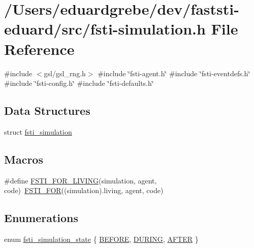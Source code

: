 \hypertarget{fsti-simulation_8h}{}\section{/\+Users/eduardgrebe/dev/faststi-\/eduard/src/fsti-\/simulation.h File Reference}
\label{fsti-simulation_8h}
{\ttfamily \#include $<$gsl/gsl\+\_\+rng.\+h$>$}\newline
{\ttfamily \#include \char`\"{}fsti-\/agent.\+h\char`\"{}}\newline
{\ttfamily \#include \char`\"{}fsti-\/eventdefs.\+h\char`\"{}}\newline
{\ttfamily \#include \char`\"{}fsti-\/config.\+h\char`\"{}}\newline
{\ttfamily \#include \char`\"{}fsti-\/defaults.\+h\char`\"{}}\newline
\subsection*{Data Structures}
\begin{DoxyCompactItemize}
\item 
struct \mbox{\hyperlink{structfsti__simulation}{fsti\+\_\+simulation}}
\end{DoxyCompactItemize}
\subsection*{Macros}
\begin{DoxyCompactItemize}
\item 
\#define \mbox{\hyperlink{fsti-simulation_8h_ab09972db973bc8382592ffc0d0c9b1ec}{F\+S\+T\+I\+\_\+\+F\+O\+R\+\_\+\+L\+I\+V\+I\+NG}}(simulation,  agent,  code)~\mbox{\hyperlink{fsti-agent_8h_a4c03aa904df401cdd442c95af046e217}{F\+S\+T\+I\+\_\+\+F\+OR}}((simulation).living, agent, code)
\end{DoxyCompactItemize}
\subsection*{Enumerations}
\begin{DoxyCompactItemize}
\item 
enum \mbox{\hyperlink{fsti-simulation_8h_aa4feb4e18e0a72b142f028a7ddf75047}{fsti\+\_\+simulation\+\_\+state}} \{ \mbox{\hyperlink{fsti-simulation_8h_aa4feb4e18e0a72b142f028a7ddf75047ae6b900100d080b3b2a415a74287ac51d}{B\+E\+F\+O\+RE}}, 
\mbox{\hyperlink{fsti-simulation_8h_aa4feb4e18e0a72b142f028a7ddf75047ac52a80f28bdc6b1cd181af2bfe35a326}{D\+U\+R\+I\+NG}}, 
\mbox{\hyperlink{fsti-simulation_8h_aa4feb4e18e0a72b142f028a7ddf75047a7b7a4cb38549c6293e591b1efc6b8521}{A\+F\+T\+ER}}
 \}
\end{DoxyCompactItemize}
